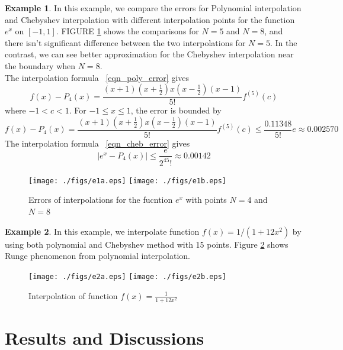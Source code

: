 \documentclass[11pt,reqno]{amsart}
\theoremstyle{definition}
\newtheorem{exmp}{Example}[section]
\begin{document}
\begin{exmp}
In this example, we compare the errors for Polynomial interpolation and Chebyshev interpolation with different interpolation points for the function $e^x$ on $[-1,1]$. FIGURE \ref{fig:e1} shows the comparisons for $N=5$ and $N=8$, and there isn't significant difference between the two interpolations for $N=5$. In the contrast, we can see better approximation for the Chebyshev interpolation near the boundary when  $N=8$.\\
The interpolation formula ~\eqref{eqn_poly_error} gives 
\begin{equation}
f(x)-P_4(x)=\frac{(x+1)(x+\frac{1}{2})x(x-\frac{1}{2})(x-1)}{5!}f^{(5)}(c)
\end{equation}
where $-1<c<1$. For $-1\leq x\leq 1$, the error is bounded by
\begin{equation*}
f(x)-P_4(x)=\frac{(x+1)(x+\frac{1}{2})x(x-\frac{1}{2})(x-1)}{5!}f^{(5)}(c)\leq \frac{0.11348}{5!}e\approx 0.002570
\end{equation*}
The interpolation formula ~\eqref{eqn_cheb_error} gives 
\begin{equation*}
|e^x-P_4(x)|\leq \frac{e}{2^45!}\approx 0.00142
\end{equation*}

\begin{figure}[H]     	\centerline{\texttt{[image: ./figs/e1a.eps]}
      	\hspace{-6pt}
     	\texttt{[image: ./figs/e1b.eps]}}
     	\hspace{-6pt}
		\caption{Errors of interpolations for the fucntion $e^x$ with points $N=4$ and $N=8$}
        \label{fig:e1}
\end{figure}
\end{exmp}

\begin{exmp}
In this example, we interpolate function $f(x)=1/(1+12x^2)$ by using both polynomial and Chebyshev method with 15 points. Figure \ref{fig:e2} shows Runge phenomenon from polynomial interpolation.
\begin{figure}[H] 	
        \centerline{\texttt{[image: ./figs/e2a.eps]}
      	\hspace{-6pt}
     	\texttt{[image: ./figs/e2b.eps]}}
     	\hspace{-6pt}
		\caption{Interpolation of function $f(x)=\frac{1}{1+12x^2}$}
        \label{fig:e2}
\end{figure}
\end{exmp}

\section{Results and Discussions}
\end{document}
